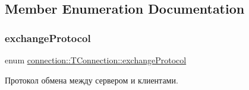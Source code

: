 \subsection{Member Enumeration Documentation}
\mbox{\label{classconnection_1_1_t_connection_a3550181cb2fa72eccfa55d23f45cea34}} 
\subsubsection{\texorpdfstring{exchange\+Protocol}{exchangeProtocol}}
{\footnotesize\ttfamily enum \hyperlink{classconnection_1_1_t_connection_a3550181cb2fa72eccfa55d23f45cea34}{connection\+::\+T\+Connection\+::exchange\+Protocol}}



Протокол обмена между сервером и клиентами. 


